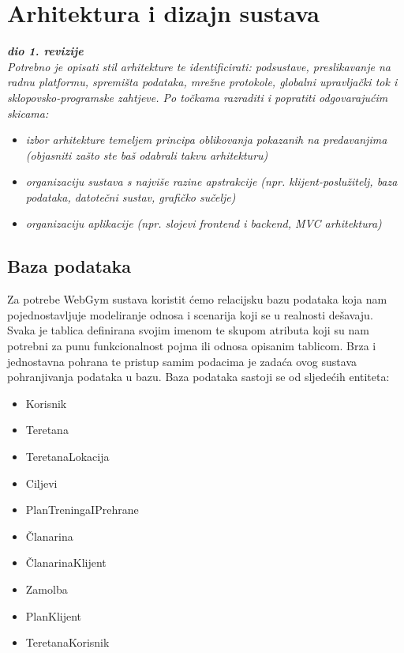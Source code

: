 \chapter{Arhitektura i dizajn sustava}
		
		\textbf{\textit{dio 1. revizije}}\\

		\textit{ Potrebno je opisati stil arhitekture te identificirati: podsustave, preslikavanje na radnu platformu, spremišta podataka, mrežne protokole, globalni upravljački tok i sklopovsko-programske zahtjeve. Po točkama razraditi i popratiti odgovarajućim skicama:}
	\begin{itemize}
		\item 	\textit{izbor arhitekture temeljem principa oblikovanja pokazanih na predavanjima (objasniti zašto ste baš odabrali takvu arhitekturu)}
		\item 	\textit{organizaciju sustava s najviše razine apstrakcije (npr. klijent-poslužitelj, baza podataka, datotečni sustav, grafičko sučelje)}
		\item 	\textit{organizaciju aplikacije (npr. slojevi frontend i backend, MVC arhitektura) }		
	\end{itemize}

	
		\section{Baza podataka}
		Za potrebe WebGym sustava koristit ćemo relacijsku bazu podataka koja nam pojednostavljuje modeliranje odnosa i scenarija koji se u realnosti dešavaju. Svaka je tablica definirana svojim imenom te skupom atributa koji su nam potrebni za punu funkcionalnost pojma ili odnosa opisanim tablicom. Brza i jednostavna pohrana te pristup samim podacima je zadaća ovog sustava pohranjivanja podataka u bazu. Baza podataka sastoji se od sljedećih entiteta:
		\begin{itemize}
	        	\item 	Korisnik
	        	\item 	Teretana 
	        	\item 	TeretanaLokacija 
	        	\item   Ciljevi
	        	\item 	PlanTreningaIPrehrane
	        	\item 	Članarina
	        	\item 	ČlanarinaKlijent
	        	\item 	Zamolba
	        	\item   PlanKlijent
	        	\item   TeretanaKorisnik
        	\end{itemize}
		
